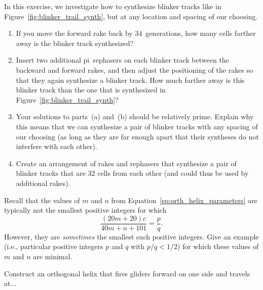 \begin{multicols}{2}
\begin{problemstar}\label{exer:two_pi_tracks_synth_spacing}
	In this exercise, we investigate how to synthesize blinker tracks like in Figure~\ref{fig:blinker_trail_synth}, but at any location and spacing of our choosing.
	
	\begin{enumerate}[label=\bf\color{ocre}(\alph*)]
		\item If you move the forward rake back by $34$~generations, how many cells farther away is the blinker track synthesized?
		
		\item Insert two additional pi~rephasers on each blinker track between the backward and forward rakes, and then adjust the positioning of the rakes so that they again synthesize a blinker track. How much farther away is this blinker track than the one that is synthesized in Figure~\ref{fig:blinker_trail_synth}?
		
		\item Your solutions to parts~(a) and~(b) should be relatively prime. Explain why this means that we can synthesize a pair of blinker tracks with any spacing of our choosing (as long as they are far enough apart that their syntheses do not interfere with each other).
		
		\item Create an arrangement of rakes and rephasers that synthesize a pair of blinker tracks that are $32$ cells from each other (and could thus be used by additional rakes).
	\end{enumerate}
\end{problemstar}


\mfilbreak


\begin{problemstar}\label{exer:caterpillar_helix_when_minimal}
	Recall that the values of $m$ and $n$ from Equation~\eqref{eq:orth_helix_parameters} are typically not the smallest positive integers for which
	\[
		\frac{(20m + 20)c}{40m + n + 101} = \frac{p}{q}.
	\]
	However, they are \emph{sometimes} the smallest such positive integers. Give an example (i.e., particular positive integers $p$ and $q$ with $p/q < 1/2$) for which these values of $m$ and $n$ are minimal.
\end{problemstar}


\mfilbreak


\begin{problem}\label{exer:construct_orthogonal_helix}
	Construct an orthogonal helix that fires gliders forward on one side and travels at...
	

\end{problem}
\end{multicols}

